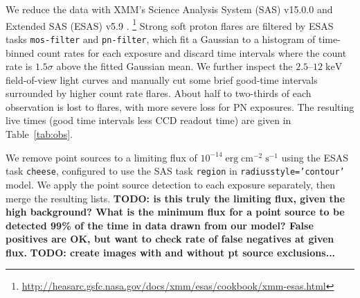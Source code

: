 \documentclass[preprint2,tighten,trackchanges]{aastex6}
\newcommand*{\mt}{\mathrm}
\newcommand*{\unit}[1]{\;\mt{#1}}  %
\begin{document}



We reduce the data with XMM's Science Analysis System (SAS) v15.0.0 and
Extended SAS (ESAS) v5.9 \citep{snowden2008, kuntz2008}.
\footnote{\url{http://heasarc.gsfc.nasa.gov/docs/xmm/esas/cookbook/xmm-esas.html}}
Strong soft proton flares are filtered by ESAS tasks \texttt{mos-filter} and
\texttt{pn-filter}, which fit a Gaussian to a histogram of time-binned count
rates for each exposure and discard time intervals where the count rate is
$1.5\sigma$ above the fitted Gaussian mean.  %
We further inspect the $2.5$--$12 \unit{keV}$ field-of-view light curves and
manually cut some brief good-time intervals surrounded by higher count rate
flares.
About half to two-thirds of each observation is lost to flares, with more
severe loss for PN exposures.
The resulting live times (good time intervals less CCD readout time) are
given in Table~\ref{tab:obs}.

We remove point sources to a limiting flux of
$10^{-14} \unit{erg\;cm^{-2}\;s^{-1}}$ using the ESAS task \texttt{cheese},
configured to use the SAS task \texttt{region} in
\texttt{radiusstyle='contour'} model.
We apply the point source detection to each exposure separately, then merge the
resulting lists.
\textbf{TODO: is this truly the limiting flux, given the high background?
What is the minimum flux for a point source to be detected 99\% of the time in
data drawn from our model?
False positives are OK, but want to check rate of false negatives at given
flux.}
\textbf{TODO: create images with and without pt source exclusions...}
\end{document}
